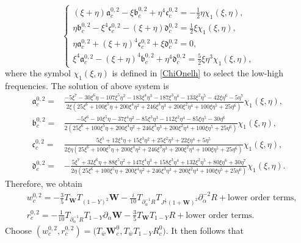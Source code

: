 \documentclass[10pt]{amsart}
\theoremstyle{remark}
\theoremstyle{definition}
\numberwithin{equation}{section}
\newcommand{\p}{\partial}
\newcommand{\al}{\alpha}
\newcommand{\f}{\frac}
\newcommand{\bw}{\mathbf{W}}
\begin{document}
\begin{equation*}
\begin{cases}
(\xi + \eta)\mathfrak{a}^{0,2}_{c}-\xi\mathfrak{b}^{0,2}_{c}+\eta^4\mathfrak{c}^{0,2}_{c}= -\f12 \eta\chi_1(\xi, \eta),\\
\eta\mathfrak{b}^{0,2}_{c}-\xi^4\mathfrak{c}^{0,2}_{c}-(\xi+\eta)\mathfrak{d}^{0,2}_{c}=\f12 \xi\chi_{1}(\xi,\eta),\\
\eta\mathfrak{a}^{0,2}_{c}+(\xi+\eta)^4\mathfrak{c}^{0,2}_{c}+\xi\mathfrak{d}^{0,2}_{c}=0,\\
\xi^4 \mathfrak{a}^{0,2}_{c}-(\xi+\eta)^4\mathfrak{b}^{0,2}_{c}+\eta^4\mathfrak{d}^{0,2}_{c}=\f52\xi\eta^3\chi_{1}(\xi,\eta),
\end{cases}
\end{equation*}
where  the symbol $\chi_{1}(\xi, \eta)$ is defined in \eqref{ChiOnelh} to select the low-high frequencies.
The solution of above system is
\begin{align*}
\mathfrak{a}^{0,2}_{c}=&\f{-5\xi^7-30\xi^6\eta-107\xi^5\eta^2-183\xi^4\eta^3-187\xi^3\eta^4-133\xi^2\eta^5-42\xi \eta^6-5\eta^7}{2\xi(25\xi^6+100\xi^5\eta+200\xi^4\eta^2+246\xi^3\eta^3+200\xi^2\eta^4+100\xi\eta^5+25\eta^6)}\chi_{1}(\xi,\eta),\\
\mathfrak{b}^{0,2}_{c}=&\f{-5\xi^6-10\xi^5\eta -37\xi^4\eta^2-85\xi^3\eta^3-112\xi^2\eta^4-85\xi\eta^5-30\eta^6}
{2(25\xi^6+100\xi^5\eta+200\xi^4\eta^2+246\xi^3\eta^3+200\xi^2\eta^4+100\xi\eta^5+25\eta^6)}\chi_{1}(\xi,\eta),\\
\mathfrak{c}^{0,2}_{c}=&\f{5\xi^5+12\xi^4\eta+15\xi^3\eta^2+25\xi^2\eta^3+22\xi\eta^4+5\eta^5}
{2\xi\eta(25\xi^6+100\xi^5\eta+200\xi^4\eta^2+246\xi^3\eta^3+200\xi^2\eta^4+100\xi\eta^5+25\eta^6)}\chi_{1}(\xi,\eta),\\
\mathfrak{d}^{0,2}_{c}=&-\f{5\xi^7+32\xi^6\eta + 88\xi^5\eta^2+147\xi^4\eta^3+158\xi^3\eta^4+132\xi^2\eta^5+80\xi\eta^6+30\eta^7}
{2\eta(25\xi^6+100\xi^5\eta+200\xi^4\eta^2+246\xi^3\eta^3+200\xi^2\eta^4+100\xi\eta^5+25\eta^6)}\chi_{1}(\xi,\eta).
\end{align*}
Therefore, we obtain
\begin{align*}
    &w^{0,2}_c = -\f35 T_{\bw}T_{(1-Y)^2}\bw - \f{i}{10} T_{\p_\al^{-1}R}  T_{J^{\frac{1}{2}}(1+\bw)^2}  \p_\al^{-2}R + \text{lower order terms},\\
    &r^{0,2}_c = -\f{1}{10} T_{\p_\al^{-1}R}T_{1-Y}\p_\al\bw-\f35 T_{\bw}T_{1-Y}  R + \text{lower order terms}.
\end{align*}
Choose $(w^{0,2}_c, r^{0,2}_c) = \big(T_{\bar{w}}\bw^0_c, T_{\bar{w}}T_{1-Y}R^0_c \big)$. It then follows that
\end{document}
